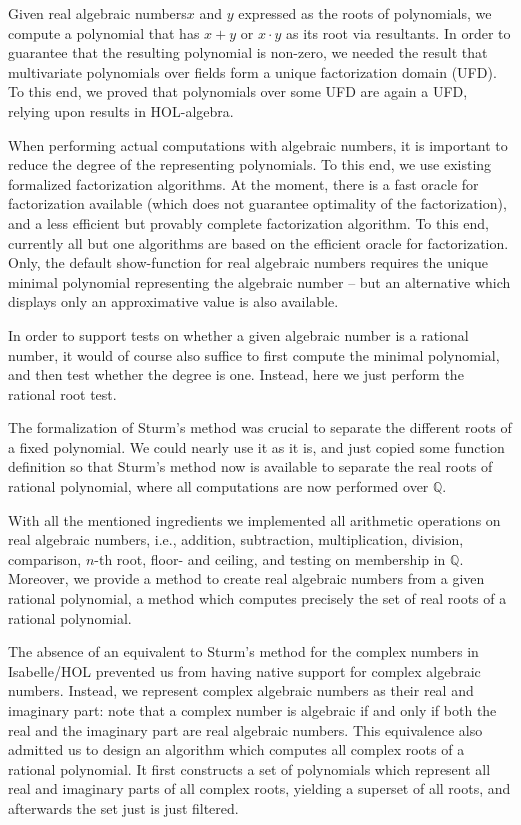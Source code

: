 \documentclass[11pt,a4paper]{article}
\newcommand\rats{\mathbb{Q}}
\newcommand\rais{real algebraic numbers\xspace}
\begin{document}
Given \rais $x$ and $y$ expressed as the roots of polynomials,
we compute a polynomial that has $x+y$ or $x \cdot y$ as its root via resultants.
In order to guarantee that the resulting polynomial is non-zero, we needed the result
that multivariate polynomials over fields form a unique factorization domain (UFD).
To this end, we proved that polynomials over some UFD are again a UFD, relying
upon results in HOL-algebra.

When performing actual computations with algebraic numbers, it is important to reduce
the degree of the representing polynomials. To this end, we use existing
formalized factorization algorithms. At the moment, there is a fast oracle for factorization
available (which does not guarantee optimality of the factorization), and a less efficient
but provably complete factorization algorithm. To this end, currently all but one algorithms are
based on the efficient oracle for factorization. Only, the default show-function for real algebraic numbers requires the unique minimal polynomial representing the algebraic number --
but an alternative which displays only an approximative value is also available.

In order to support tests on whether a given algebraic number is a rational number, 
it would of course also suffice to first compute the minimal polynomial, and then test 
whether the degree is one. Instead, here we just perform the rational root test.

The formalization of Sturm's method \cite{Sturm-AFP} was crucial to separate the different
roots of a fixed polynomial. 
We could nearly use it as it is, and just copied some function definition so
that Sturm's method now is available to separate the real roots of rational polynomial, where
all computations are now performed over $\rats$.

With all the mentioned ingredients we implemented all arithmetic operations on real algebraic
numbers, i.e., addition, subtraction, multiplication, division, comparison, $n$-th root, floor-
and ceiling, and testing on membership in $\rats$. Moreover, we provide a method
to create real algebraic numbers from a given rational polynomial, a method which computes
precisely the set of real roots of a rational polynomial.

\medskip

The absence of an equivalent to Sturm's method for the complex numbers in Isabelle/HOL prevented
us from having native support for complex algebraic numbers. Instead, we represent complex
algebraic numbers as their real and imaginary part: note that a complex number is algebraic if
and only if both the real and the imaginary part are real algebraic numbers.
This equivalence also admitted us to design an algorithm which computes all complex roots
of a rational polynomial. It first constructs a set of polynomials which represent all
real and imaginary parts of all complex roots, yielding a superset of all roots,
and afterwards the set just is just filtered.
\end{document}
